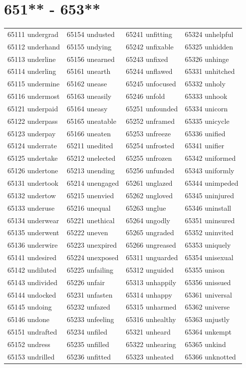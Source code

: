 \documentclass[10pt, oneside]{book}
\begin{document}
\begin{table}
	\centering
	\section*{651** - 653**}
	\begin{tabular}{l l l l}
65111 undergrad &65154 undusted &65241 unfitting &65324 unhelpful\\
65112 underhand &65155 undying &65242 unfixable &65325 unhidden\\
65113 underline &65156 unearned &65243 unfixed &65326 unhinge\\
65114 underling &65161 unearth &65244 unflawed &65331 unhitched\\
65115 undermine &65162 unease &65245 unfocused &65332 unholy\\
65116 undermost &65163 uneasily &65246 unfold &65333 unhook\\
65121 underpaid &65164 uneasy &65251 unfounded &65334 unicorn\\
65122 underpass &65165 uneatable &65252 unframed &65335 unicycle\\
65123 underpay &65166 uneaten &65253 unfreeze &65336 unified\\
65124 underrate &65211 unedited &65254 unfrosted &65341 unifier\\
65125 undertake &65212 unelected &65255 unfrozen &65342 uniformed\\
65126 undertone &65213 unending &65256 unfunded &65343 uniformly\\
65131 undertook &65214 unengaged &65261 unglazed &65344 unimpeded\\
65132 undertow &65215 unenvied &65262 ungloved &65345 uninjured\\
65133 underuse &65216 unequal &65263 unglue &65346 uninstall\\
65134 underwear &65221 unethical &65264 ungodly &65351 uninsured\\
65135 underwent &65222 uneven &65265 ungraded &65352 uninvited\\
65136 underwire &65223 unexpired &65266 ungreased &65353 uniquely\\
65141 undesired &65224 unexposed &65311 unguarded &65354 unisexual\\
65142 undiluted &65225 unfailing &65312 unguided &65355 unison\\
65143 undivided &65226 unfair &65313 unhappily &65356 unissued\\
65144 undocked &65231 unfasten &65314 unhappy &65361 universal\\
65145 undoing &65232 unfazed &65315 unharmed &65362 universe\\
65146 undone &65233 unfeeling &65316 unhealthy &65363 unjustly\\
65151 undrafted &65234 unfiled &65321 unheard &65364 unkempt\\
65152 undress &65235 unfilled &65322 unhearing &65365 unkind\\
65153 undrilled &65236 unfitted &65323 unheated &65366 unknotted\\
	\end{tabular}
 \end{table}
\clearpage
\end{document}
